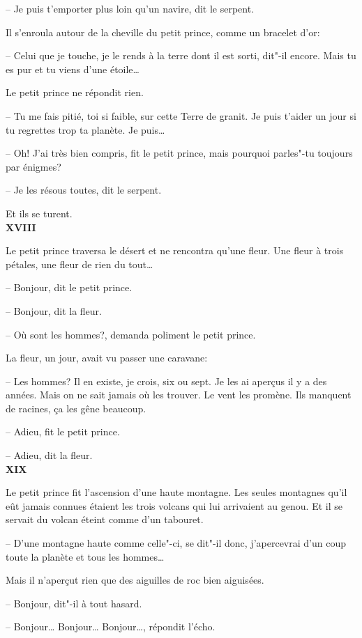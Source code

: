 \begin{Parallel}[p]{}{}
{-- Je puis t'emporter plus loin qu'un navire, dit le serpent.

Il s'enroula autour de la cheville du petit prince, comme un bracelet d'or:

-- Celui que je touche, je le rends à la terre dont il
est sorti, dit"-il encore. Mais tu es pur et tu viens
d'une étoile\ldots{}

Le petit prince ne répondit rien.

-- Tu me fais pitié, toi si faible, sur cette Terre de
granit. Je puis t'aider un jour si tu regrettes trop ta
planète. Je puis\ldots{}

-- Oh! J'ai très bien compris, fit le petit prince,
mais pourquoi parles"-tu toujours par énigmes?

-- Je les résous toutes, dit le serpent.

Et ils se turent.\\

\textbf{XVIII}

Le petit prince traversa le désert et ne rencontra
qu'une fleur. Une fleur à trois pétales, une fleur de
rien du tout\ldots{}

-- Bonjour, dit le petit prince.

-- Bonjour, dit la fleur.

-- Où sont les hommes?, demanda poliment le petit prince.

La fleur, un jour, avait vu passer une caravane:

-- Les hommes? Il en existe, je crois, six ou sept. Je
les ai aperçus il y a des années. Mais on ne sait
jamais où les trouver. Le vent les promène. Ils manquent de racines, ça les gêne beaucoup.

-- Adieu, fit le petit prince.

-- Adieu, dit la fleur.\\

\textbf{XIX}

Le petit prince fit l'ascension d'une haute montagne. Les seules montagnes qu'il eût jamais
connues étaient les trois volcans qui lui arrivaient au
genou. Et il se servait du volcan éteint comme d'un
tabouret.

-- D'une montagne haute comme celle"-ci, se dit"-il donc, j'apercevrai d'un coup toute la planète et tous les hommes\ldots{}

Mais il n'aperçut rien que des aiguilles de roc bien aiguisées.

-- Bonjour, dit"-il à tout hasard.

-- Bonjour\ldots{} Bonjour\ldots{} Bonjour\ldots{}, répondit l'écho.

}
\end{Parallel}
